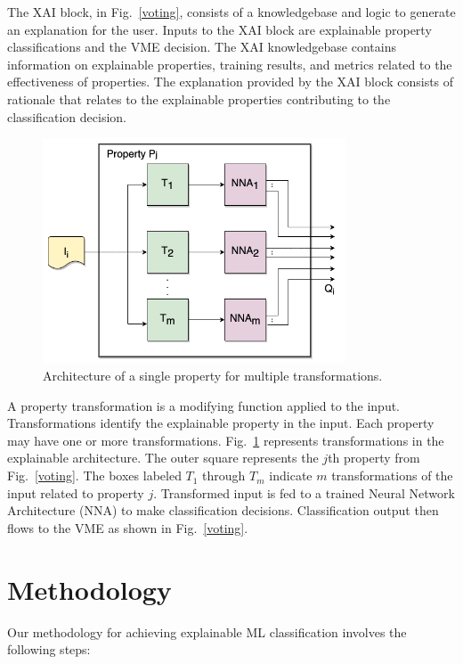 \documentclass[conference]{IEEEtran}
\begin{document}
The XAI block, in Fig.~\ref{voting}, consists of a knowledgebase and logic to generate an explanation for the user.  Inputs to the XAI block are explainable property classifications and the VME decision.  The XAI knowledgebase contains information on explainable properties, training results, and metrics related to the effectiveness of properties.  The explanation provided by the XAI block consists of rationale that relates to the explainable properties contributing to the classification decision.

 \begin{figure}[htbp]
\centerline{\includegraphics[width=90mm]{./images/property_transforms.png}}
\caption{Architecture of a single property for multiple transformations.}
\label{proptrans}
\end{figure} 

A property transformation is a modifying function applied to the input.  Transformations identify the explainable property in the input.  Each property may have one or more transformations.   Fig.~\ref{proptrans} represents transformations in the explainable architecture.  The outer square represents the $j$th property from Fig.~\ref{voting}.  The boxes labeled $T_1$ through $T_m$ indicate $m$ transformations of the input related to property $j$.  Transformed input is fed to a trained Neural Network Architecture (NNA) to make classification decisions.  Classification output then flows to the VME as shown in Fig.~\ref{voting}.

\section{Methodology}
 
Our methodology for achieving explainable ML classification involves the following steps:
\end{document}
